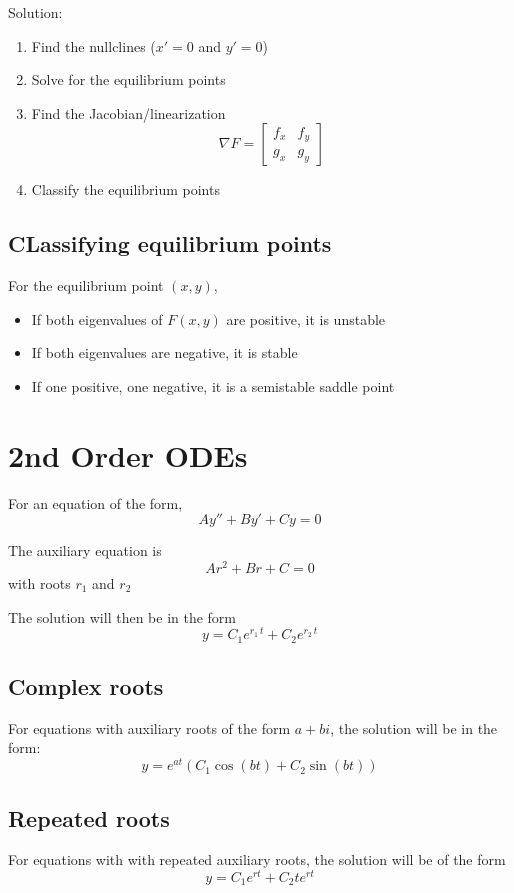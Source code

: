\documentclass[12pt]{article}
\begin{document}
Solution: 
\begin{enumerate}
    \item Find the nullclines ($x' = 0$ and $y' = 0$) 
    \item Solve for the equilibrium points
    \item Find the Jacobian/linearization
    \[\nabla F = \begin{bmatrix}
        f_x & f_y\\
        g_x & g_y
    \end{bmatrix}\]
    \item Classify the equilibrium points 
\end{enumerate}

\subsection*{CLassifying equilibrium points}
For the equilibrium point $(x, y)$,
\begin{itemize}
    \item If both eigenvalues of $F(x, y)$ are positive, it is unstable
    \item If both eigenvalues are negative, it is stable
    \item If one positive, one negative, it is a semistable saddle point
\end{itemize}

\section{2nd Order ODEs}
For an equation of the form, 
\[Ay'' + By' + Cy = 0\]

The auxiliary equation is
\[Ar^2 + Br + C = 0\]
with roots $r_1$ and $r_2$

The solution will then be in the form 
\[\boxed{y = C_1e^{r_1\, t} + C_2 e^{r_2\, t}}\]

\subsection*{Complex roots}
For equations with auxiliary roots of the form $a + bi$, the solution will be in the form:
\[\boxed{y = e^{at} \left(C_1 \cos(bt) + C_2 \sin(bt)\right)}\]

\subsection*{Repeated roots}
For equations with with repeated auxiliary roots, the solution will be of the form 
\[\boxed{y = C_1 e^{rt} + C_2te^{rt}}\]
\end{document}
